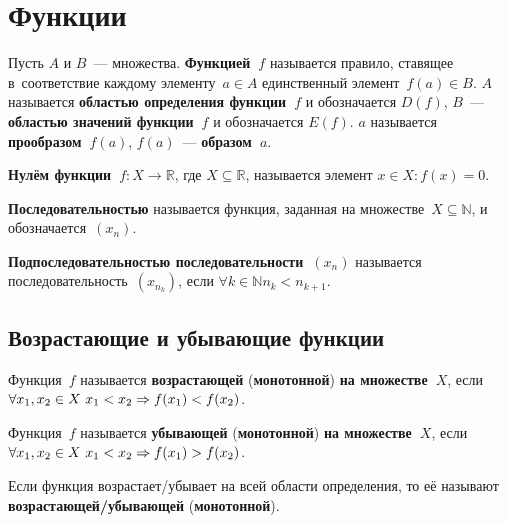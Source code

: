 \section{Функции}
 Пусть $A$ и $B$~--- множества.
\textbf{Функцией~$f$} называется правило, ставящее в~соответствие каждому элементу~$a \in A$ единственный элемент~$f(a) \in B$.
$A$ называется \textbf{областью определения функции~$f$} и обозначается $D(f)$, $B$~--- \textbf{областью значений функции~$f$} и обозначается $E(f)$.
$a$ называется \textbf{прообразом~$f(a)$}, $f(a)$~--- \textbf{образом~$a$}.

\textbf{Нулём функции~$f \colon X \to \mathbb R$}, где $X \subseteq \mathbb R$, называется элемент $x \in X \colon f(x) = 0$.

 \textbf{Последовательностью} называется функция, заданная на множестве~$X \subseteq \mathbb N$, и обозначается~$(x_n)$.

\textbf{Подпоследовательностью последовательности~$(x_n)$} называется последовательность~$(x_{n_k})$, если $\forall k \in \mathbb N \allowbreak n_k < n_{k+1}$.

\subsection{Возрастающие и убывающие функции}
 Функция~$f$ называется \textbf{возрастающей} (\textbf{монотонной}) \textbf{на множестве~$X$}, если $\forall x_1, x_2 \in X \ x_1 < x_2 \opbr\Rightarrow f(x_1) < \nobreak f(x_2)$.

 Функция~$f$ называется \textbf{убывающей} (\textbf{монотонной}) \textbf{на множестве~$X$}, если $\forall x_1, x_2 \in X \ x_1 < x_2 \opbr\Rightarrow f(x_1) > \nobreak f(x_2)$.

Если функция возрастает/убывает на всей области определения, то её называют \textbf{возрастающей/убывающей} (\textbf{монотонной}).

